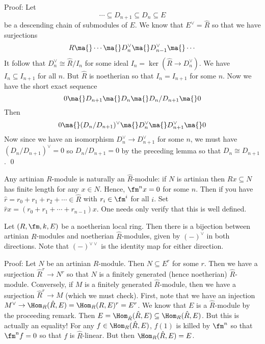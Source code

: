 \noindent Proof: Let 
\[
\cdots \subseteq D_{n+1} \subseteq D_n \subseteq E
\]
be a descending chain of submodules of $E$. We know that $E^\vee=\hat{R}$ so that we have surjections
\[
R \ma{} \cdots \ma{} D_n^\vee \ma{} D_{n-1}^\vee \ma{} \cdots
\]
It follow that $D_n^\vee \cong \hat{R}/I_n$ for some ideal $I_n=\ker(\hat{R} \to D_n^\vee)$. We have $I_n \subseteq I_{n+1}$ for all $n$. But $\hat{R}$ is noetherian so that $I_n=I_{n+1}$ for some $n$. Now we have the short exact sequence
\[
0 \ma{} D_{n+1} \ma{} D_n \ma{} D_n/D_{n+1} \ma{} 0
\]
Then
\[
0 \ma{} (D_n/D_{n+1})^\vee \ma{} D_n^\vee \ma{} D_{n+1}^\vee \ma{} 0
\]
Now since we have an isomorphism $D_n^\vee \to D_{n+1}^\vee$ for some $n$, we must have $(D_n/D_{n+1})^\vee=0$ so $D_n/D_{n+1}=0$ by the preceding lemma so that $D_n \cong D_{n+1}$. \qed \\

\begin{rem}
Any artinian $R$-module is naturally an $\hat{R}$-module: if $N$ is artinian then $Rx \subseteq N$ has finite length for any $x \in N$. Hence, $\fm^n x=0$ for some $n$. Then if you have $\hat{r}=r_0+r_1+r_2+\cdots \in \hat{R}$ with $r_i \in \fm^i$ for all $i$. Set $\hat{r} x=(r_0+r_1+\cdots+r_{n-1})x$. One needs only verify that this is well defined. 
\end{rem}

\begin{thmm}
Let $(R,\fm,k,E)$ be a noetherian local ring. Then there is a bijection between artinian $R$-modules and noetherian $\hat{R}$-modules, given by $(-)^\vee$ in both directions. Note that $(-)^{\vee\vee}$ is the identity map for either direction. 
\end{thmm}

\noindent Proof: Let $N$ be an artinian $R$-module. Then $N \subseteq E^r$ for some $r$. Then we have a surjection $\hat{R}^r \to N^r$ so that $N$ is a finitely generated (hence noetherian) $\hat{R}$-module. Conversely, if $M$ is a finitely generated $\hat{R}$-module, then we have a surjection $\hat{R}^r \to M$ (which we must check). First, note that we have an injection $M^\vee \to \Hom_R(\hat{R},E)=\Hom_R(R,E)^r=E^r$. We know that $E$ is a $\hat{R}$-module by the proceeding remark. Then $E=\Hom_{\hat{R}}(\hat{R},E) \subseteq \Hom_R(\hat{R},E)$. But this is actually an equality! For any $f \in \Hom_R(\hat{R},E)$, $f(1)$ is killed by $\fm^n$ so that $\fm^n f=0$ so that $f$ is $\hat{R}$-linear. But then $\Hom_R(\hat{R},E)=E$. 

